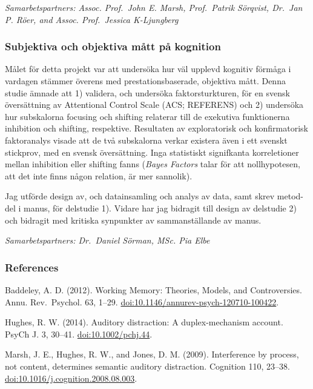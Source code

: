 \documentclass[]{article}
\begin{document}
\emph{Samarbetspartners: Assoc. Prof.~John E. Marsh, Prof.~Patrik
Sörqvist, Dr.~Jan P. Röer, and Assoc. Prof.~Jessica K-Ljungberg}

\hypertarget{subjektiva-och-objektiva-matt-pa-kognition}{%
\subsubsection{Subjektiva och objektiva mått på
kognition}\label{subjektiva-och-objektiva-matt-pa-kognition}}

Målet för detta projekt var att undersöka hur väl upplevd kognitiv
förmåga i vardagen stämmer överens med prestationsbaserade, objektiva
mått. Denna studie ämnade att 1) validera, och undersöka
faktorsturkturen, för en svensk översättning av Attentional Control
Scale (ACS; REFERENS) och 2) undersöka hur subskalorna focusing och
shifting relaterar till de exekutiva funktionerna inhibition och
shifting, respektive. Resultaten av exploratorisk och konfirmatorisk
faktoranalys visade att de två subskalorna verkar existera även i ett
svenskt stickprov, med en svensk översättning. Inga statistiskt
signifkanta korreletioner mellan inhibition eller shifting fanns
(\emph{Bayes Factors} talar för att nollhypotesen, att det inte finns
någon relation, är mer sannolik).

Jag utförde design av, och datainsamling och analys av data, samt skrev
metod-del i manus, för delstudie 1). Vidare har jag bidragit till design
av delstudie 2) och bidragit med kritiska synpunkter av sammanställande
av manus.

\emph{Samarbetspartners: Dr.~Daniel Sörman, MSc. Pia Elbe}

\newpage

\hypertarget{references}{%
\subsubsection{References}\label{references}}

Baddeley, A. D. (2012). Working Memory: Theories, Models, and
Controversies. Annu. Rev.~Psychol. 63, 1--29.
\url{doi:10.1146/annurev-psych-120710-100422}.

Hughes, R. W. (2014). Auditory distraction: A duplex-mechanism account.
PsyCh J. 3, 30--41. \url{doi:10.1002/pchj.44}.

Marsh, J. E., Hughes, R. W., and Jones, D. M. (2009). Interference by
process, not content, determines semantic auditory distraction.
Cognition 110, 23--38. \url{doi:10.1016/j.cognition.2008.08.003}.
\end{document}
